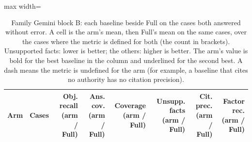 \begin{table}[t]
\centering\footnotesize
\begin{adjustbox}{max width=\textwidth}
\begin{tabular}{@{}lrrrrrrr@{}}
\toprule
Arm & Cases & Obj. recall (arm / Full) & Ans. cov. (arm / Full) & Coverage (arm / Full) & Unsupp. facts (arm / Full) & Cit. prec. (arm / Full) & Factor rec. (arm / Full) \\
\midrule
\bottomrule
\end{tabular}
\end{adjustbox}
\caption{Family Gemini block B: each baseline beside Full on the cases both answered without error. A cell is the arm's mean, then Full's mean on the same cases, over the cases where the metric is defined for both (the count in brackets). Unsupported facts: lower is better; the others: higher is better. The arm's value is bold for the best baseline in the column and underlined for the second best. A dash means the metric is undefined for the arm (for example, a baseline that cites no authority has no citation precision).}
\label{tab:main_shravani_gem}
\end{table}